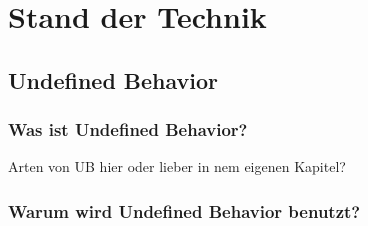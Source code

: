 \chapter{Stand der Technik}
\label{ch:sdt}

\section{Undefined Behavior}
\label{sec:ub}

\subsection{Was ist Undefined Behavior?}
\label{subsec:ub_was}

Arten von UB hier oder lieber in nem eigenen Kapitel?

\subsection{Warum wird Undefined Behavior benutzt?}
\label{subsec:ub_warum}

\subsection{}